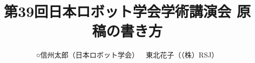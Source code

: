 \documentclass[a4paper]{jarticle}  %
\begin{document}
\title{第39回日本ロボット学会学術講演会 原稿の書き方}
\author{○信州太郎（日本ロボット学会）\ \ 東北花子（（株）RSJ）}

\setlength{\baselineskip}{4.4mm}	%
\maketitle


\end{document}
